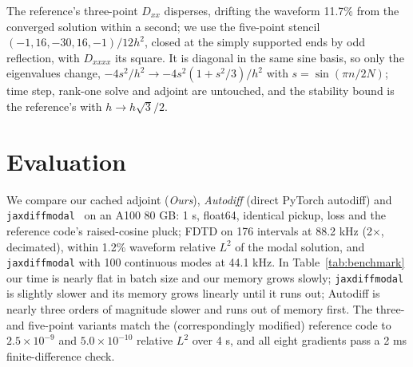 \documentclass[a4paper]{article}
\begin{document}
\begin{sloppy}
The reference's three-point $D_{xx}$ disperses, drifting the waveform 11.7\%
from the converged solution within a second; we use the five-point stencil
$(-1,16,-30,16,-1)/12h^2$, closed at the simply supported ends by odd
reflection, with $D_{xxxx}$ its square. It is diagonal in the same sine
basis, so only the eigenvalues change, $-4s^2/h^2\to-4s^2(1+s^2/3)/h^2$ with
$s=\sin(\pi n/2N)$; time step, rank-one solve and adjoint are untouched, and
the stability bound is the reference's with $h\to h\sqrt{3}/2$.

\section{Evaluation}
We compare our cached adjoint (\emph{Ours}), \emph{Autodiff} (direct PyTorch
autodiff) and \texttt{jaxdiffmodal}~\cite{diaz2025} on an A100 80 GB:
1 s, float64, identical pickup, loss and the reference code's raised-cosine
pluck; FDTD on 176 intervals at 88.2 kHz (2$\times$, decimated), within
1.2\% waveform relative $L^2$ of the modal solution, and \texttt{jaxdiffmodal}
with 100 continuous modes at 44.1 kHz.
In Table~\ref{tab:benchmark} our time is nearly flat in batch size and our
memory grows slowly; \texttt{jaxdiffmodal} is slightly slower and its memory
grows linearly until it runs out; Autodiff is nearly three orders of magnitude
slower and runs out of memory first.
The three- and five-point variants match the (correspondingly modified)
reference code to $2.5\times10^{-9}$ and $5.0\times10^{-10}$ relative $L^2$
over 4 s, and all eight gradients pass a 2 ms finite-difference check.

\begin{table}[!h]
 \centering\footnotesize
 \setlength{\tabcolsep}{3pt}\renewcommand{\arraystretch}{1.08}
 \caption{Raised-cosine pluck, 1 s, eight gradients: seconds per evaluation
 and peak GPU memory, each block shaded by rank from white (best) to purple
 (worst); OOM: out of GPU memory.}
 \label{tab:benchmark}
 
\end{table}


{\footnotesize}
\end{sloppy}
\end{document}
